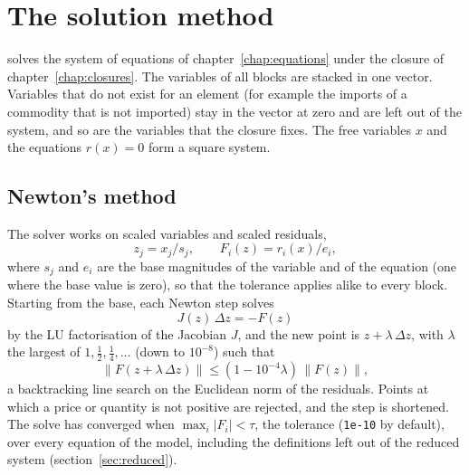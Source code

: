\chapter{The solution method}\label{chap:solution}

 solves the system of equations of
chapter~\ref{chap:equations} under the closure of chapter~\ref{chap:closures}.
The variables of all blocks are stacked in one vector. Variables that do not
exist for an element (for example the imports of a commodity that is not
imported) stay in the vector at zero and are left out of the system, and so
are the variables that the closure fixes. The free variables $x$ and the
equations $r(x) = 0$ form a square system.

\section{Newton's method}\label{sec:newton}

The solver works on scaled variables and scaled residuals,
\begin{equation*}
z_j = x_j / s_j, \qquad F_i(z) = r_i(x) / e_i,
\end{equation*}
where $s_j$ and $e_i$ are the base magnitudes of the variable and of the
equation (one where the base value is zero), so that the tolerance applies
alike to every block. Starting from the base, each Newton step solves
\begin{equation*}
J(z)\,\Delta z = -F(z)
\end{equation*}
by the LU factorisation of the Jacobian $J$, and the new point is
$z + \lambda\,\Delta z$, with $\lambda$ the largest of $1, \tfrac12, \tfrac14,
\dots$ (down to $10^{-8}$) such that
\begin{equation*}
\lVert F(z + \lambda\,\Delta z)\rVert \le (1 - 10^{-4}\lambda)\,\lVert F(z)\rVert,
\end{equation*}
a backtracking line search on the Euclidean norm of the residuals. Points at
which a price or quantity is not positive are rejected, and the step is
shortened. The solve has converged when $\max_i |F_i| < \tau$, the tolerance
(\texttt{1e-10} by default), over every equation of the model, including the
definitions left out of the reduced system (section~\ref{sec:reduced}).


